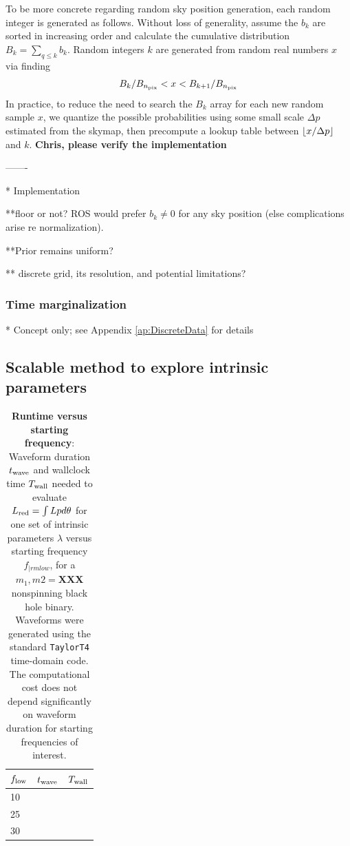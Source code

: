 \documentclass[twocolumn,prd,nofootinbib]{revtex4}
\newcommand\editremark[1]{{\color{red} #1}}
\DeclarePairedDelimiter\floor{\lfloor}{\rfloor}
\begin{document}
To be more concrete regarding random sky position generation, each random integer is generated as follows. 
%
Without loss of generality, assume the $b_k$ are sorted in increasing order and calculate the cumulative distribution $B_k
= \sum_{q\le k} b_k$.   Random integers $k$ are generated from random real numbers $x$ via finding
\begin{eqnarray}
 B_k/B_{n_{\rm pix}} < x <  B_{k+1}/B_{n_{\rm pix}}
\end{eqnarray}
In practice, to reduce the need to search the $B_k$ array for each new random sample $x$, we quantize the possible probabilities
using some small scale $\Delta p$ estimated from the skymap, then  precompute a lookup table between $\floor*{x/\Delta
  p}$ and $k$.    \textbf{Chris, please verify the implementation}




-------

*  \editremark{Implementation}

**floor or not? ROS would prefer $b_k \ne 0$ for any sky position (else complications arise re normalization).

**Prior remains uniform?

**  discrete grid, its resolution, and potential limitations?

\subsubsection{Time marginalization}

* Concept only; see Appendix \ref{ap:DiscreteData} for details



\subsection{Scalable method to explore intrinsic parameters }

\begin{table}
\begin{tabular}{lll}
$f_{\rm low}$ & $t_{\rm wave}$ & $T_{\rm wall}$ \\\hline
10 & & \\
25 & & \\
30 & & \\
\end{tabular}
\caption{\textbf{Runtime versus starting frequency}: Waveform duration $t_{\rm wave}$ and wallclock time $T_{\rm wall}$  needed to evaluate $L_{\rm red}=\int L p d\theta$
  for one set of intrinsic parameters $\lambda$ versus starting frequency $f_{|rm low}$, for a $m_1,m2=\textbf{XXX}$
  nonspinning black hole binary.  Waveforms were generated using the standard \texttt{TaylorT4} time-domain code.  The
  computational cost does not depend significantly on waveform duration for starting frequencies of interest. 
}
\end{table}
\end{document}
